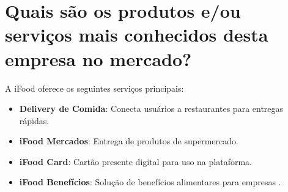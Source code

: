 \section{Quais são os produtos e/ou serviços mais conhecidos desta empresa no mercado?}

A iFood oferece os seguintes serviços principais:

\begin{itemize}
    \item \textbf{Delivery de Comida}: Conecta usuários a restaurantes para entregas rápidas.
    \item \textbf{iFood Mercados}: Entrega de produtos de supermercado.
    \item \textbf{iFood Card}: Cartão presente digital para uso na plataforma.
    \item \textbf{iFood Benefícios}: Solução de benefícios alimentares para empresas \cite{ifood2023products}.
\end{itemize}

